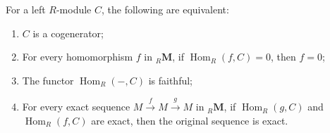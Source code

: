 For a left $R$-module $C$, the following are equivalent:
\begin{enumerate}
\item[(a)] $C$ is a cogenerator;
\item[(b)] For every homomorphism $f$ in ${}_R\mathbf{M}$, if $\operatorname{Hom}_R(f, C) = 0$, then $f = 0$;
\item[(c)] The functor $\operatorname{Hom}_R(-, C)$ is faithful;
\item[(d)] For every exact sequence $M \xrightarrow{f} M \xrightarrow{g} M$ in ${}_R\mathbf{M}$, if $\operatorname{Hom}_R(g, C)$ and $\operatorname{Hom}_R(f, C)$ are exact, then the original sequence is exact.
\end{enumerate}
